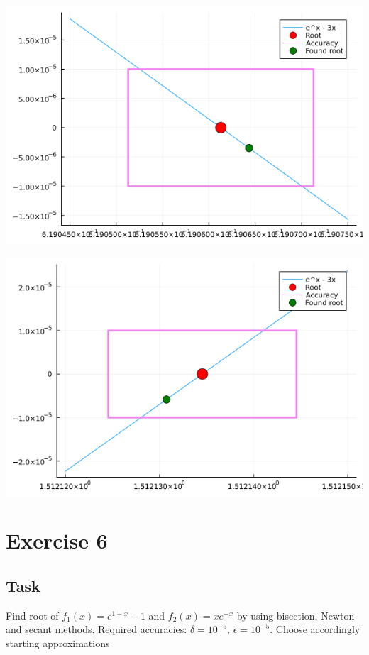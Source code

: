 \documentclass[11pt]{article}
\begin{document}
\begin{minipage}{0.8\linewidth}
\begin{minipage}{0.4\linewidth}
    \includegraphics[scale=0.4]{resources/ex5_plot_1}
\end{minipage}
\hfill
\begin{minipage}{0.4\linewidth}
    \includegraphics[scale=0.4]{resources/ex5_plot_2}
\end{minipage}
\end{minipage}
\section{Exercise 6}
\subsection{Task}
Find root of $f_1(x) = e^{1-x} - 1$ and $f_2(x) = xe^{-x}$ by using bisection, Newton and secant methods. Required accuracies: $\delta=10^{-5}$, $\epsilon=10^{-5}$. Choose accordingly starting approximations
\end{document}
